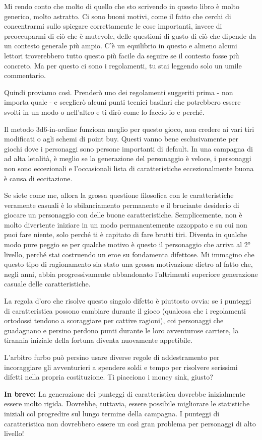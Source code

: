 
Mi rendo conto che molto di quello che sto scrivendo in questo libro è molto generico, molto astratto. Ci sono buoni motivi, come il fatto che cerchi di concentrarmi sullo spiegare correttamente le cose importanti, invece di preoccuparmi di ciò che è mutevole, delle questioni di gusto di ciò che dipende da un contesto generale più ampio. C'è un equilibrio in questo e almeno alcuni lettori troverebbero tutto questo più facile da seguire se il contesto fosse più concreto. Ma per questo ci sono i regolamenti, tu stai leggendo solo un umile commentario.

Quindi proviamo così. Prenderò uno dei regolamenti suggeriti prima - non importa quale - e sceglierò alcuni punti tecnici basilari che potrebbero essere svolti in un modo o nell'altro e ti dirò come lo faccio io e perché.


Il metodo 3d6-in-ordine funziona meglio per questo gioco, non credere ai vari tiri modificati o agli schemi di point buy. Questi vanno bene esclusivamente per giochi dove i personaggi sono persone importanti di default. In una campagna di  ad alta letalità, è meglio se la generazione del personaggio è veloce, i personaggi non sono eccezionali e l'occasionali lista di caratteristiche eccezionalmente buona è causa di eccitazione.

Se siete come me, allora la grossa questione filosofica con le caratteristiche veramente casuali è lo sbilanciamento permanente e il bruciante desiderio di giocare un personaggio con delle buone caratteristiche. Semplicemente, non è molto divertente iniziare in un modo permanentemente azzoppato e su cui non puoi fare niente, solo perché ti è capitato di fare brutti tiri. Diventa in qualche modo pure peggio se per qualche motivo è questo il personaggio che arriva al 2° livello, perché stai costruendo un eroe su fondamenta difettose. Mi immagino che questo tipo di ragionamento sia stato una grossa motivazione dietro al fatto che, negli anni, \dnd{} abbia progressivamente abbandonato l'altrimenti superiore generazione casuale delle caratteristiche.

La regola d'oro che risolve questo singolo difetto è piuttosto ovvia: se i punteggi di caratteristica possono cambiare durante il gioco (qualcosa che i regolamenti ortodossi tendono a scoraggiare per cattive ragioni), coi personaggi che guadagnano e persino perdono punti durante le loro avventurose carriere, la tirannia iniziale della fortuna diventa nuovamente appetibile. 

L'arbitro furbo può persino usare diverse regole di addestramento per incoraggiare gli avventurieri a spendere soldi e tempo per risolvere serissimi difetti nella propria costituzione. Ti piacciono i money sink, giusto?

\textbf{In breve:} La generazione dei punteggi di caratteristica dovrebbe inizialmente essere molto rigida. Dovrebbe, tuttavia, essere possibile migliorare le statistiche iniziali col progredire sul lungo termine della campagna. I punteggi di caratteristica non dovrebbero essere un così gran problema per personaggi di alto livello!